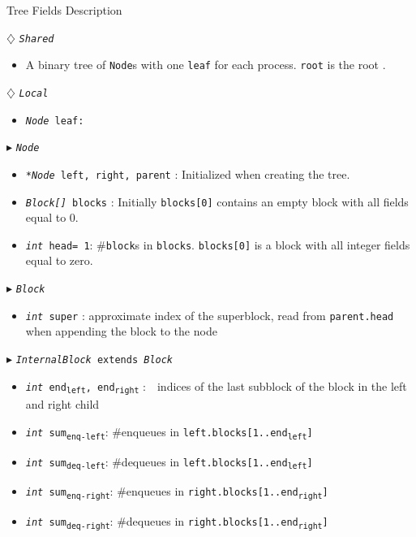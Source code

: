 \documentclass[acmsmall,nonacm,anonymous]{acmart}
\newcommand{\sub}[1]{\textsubscript{#1}}
\renewcommand{\tt}[1]{\texttt{#1}}
\renewcommand{\sl}[1]{\textsl{#1}}
\newcommand{\nf}[1]{{\normalfont{\texttt{#1}}}}
\newcommand{\head}{head}
\begin{document}
\begin{algorithm}
\caption{Tree Fields Description}
\begin{algorithmic}[1]
\setcounter{ALG@line}{1}


\Statex $\diamondsuit$ \tt{\sl{Shared}}
\begin{itemize}
\item \textsf{A binary tree of \tt{Node}s with one \tt{leaf} for each process. \tt{root} is the root \nf{node}.}
\end{itemize}

\Statex $\diamondsuit$ \tt{\sl{Local}}
\begin{itemize}
\item \tt{\sl{Node} leaf:} 
\end{itemize}

\Statex $\blacktriangleright$ \tt{\sl{Node}}
\begin{itemize}
\item \tt{\sl{*Node} left, right, parent} \textsf{: Initialized  when creating the tree.}
\item \tt{\sl{Block[]} blocks} \textsf{: Initially \tt{blocks[0]} contains an empty block with all fields equal to 0.}
\item \tt{\sl{int} \head= 1}\textsf{: \#\tt{block}s in \tt{blocks}. \tt{blocks[0]} is a block with all integer fields equal to zero.}
\end{itemize}

\Statex $\blacktriangleright$ \tt{\sl{Block}} 

\begin{itemize}
  \item \tt{\sl{int} super}
  \textsf{: approximate index of the superblock, read from \tt{parent.head} when appending the block to the node}
\end{itemize}



\Statex $\blacktriangleright$ \tt{\sl{InternalBlock} extends \sl{Block}}
\begin{itemize}
    \item \tt{\sl{int} end\sub{left}, end\sub{right}}
  \textsf{:~~indices of the last subblock of the block in the left and right child}
  \item \tt{\sl{int} sum\sub{enq-left}}\textsf{: \#enqueues in \tt{left.blocks[1..end\sub{left}]}}
  \item \tt{\sl{int} sum\sub{deq-left}}\textsf{: \#dequeues in \tt{left.blocks[1..end\sub{left}]}}
  \item \tt{\sl{int} sum\sub{enq-right}}\textsf{: \#enqueues in \tt{right.blocks[1..end\sub{right}]}}
  \item \tt{\sl{int} sum\sub{deq-right}}\textsf{: \#dequeues in \tt{right.blocks[1..end\sub{right}]}}
\end{itemize}


\end{algorithmic}
\end{algorithm}
\end{document}
